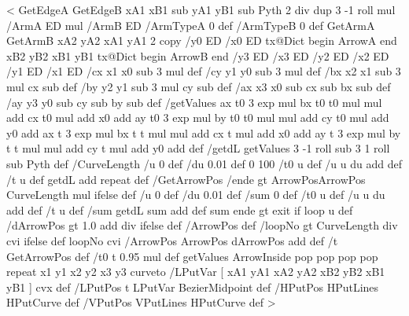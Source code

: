 %
<{%
	GetEdgeA GetEdgeB
	xA1 xB1 sub yA1 yB1 sub
	Pyth 2 div dup 3 -1 roll mul
	/ArmA ED
	mul
	/ArmB ED
	/ArmTypeA 0 def
	/ArmTypeB 0 def
	GetArmA GetArmB
	xA2 yA2 xA1 yA1
	2 copy
	/y0 ED /x0 ED
	tx@Dict begin
		ArrowA
	end
	xB2 yB2 xB1 yB1
	tx@Dict begin
		ArrowB
	end
	/y3 ED /x3 ED /y2 ED /x2 ED /y1 ED /x1 ED
	/cx x1 x0 sub 3 mul def
	/cy y1 y0 sub 3 mul def
	/bx x2 x1 sub 3 mul cx sub def
	/by y2 y1 sub 3 mul cy sub def
	/ax x3 x0 sub cx sub bx sub def
	/ay y3 y0 sub cy sub by sub def
	/getValues {
		ax t0 3 exp mul bx t0 t0 mul mul add cx t0 mul add x0 add
		ay t0 3 exp mul by t0 t0 mul mul add cy t0 mul add y0 add
		ax t 3 exp mul bx t t mul mul add cx t mul add x0 add
	ay t 3 exp mul by t t mul mul add cy t mul add y0 add
	} def
	/getdL {
		getValues
		3 -1 roll sub 3 1 roll sub Pyth
	} def
	/CurveLength {
		/u 0 def
		/du 0.01 def
		0 100 {
			/t0 u def
			/u u du add def
			/t u def
			getdL add
		} repeat } def
	/GetArrowPos {
		/ende \psk@ArrowInsidePos{} gt {ArrowPos}{ArrowPos CurveLength mul} ifelse def
		/u 0 def
		/du 0.01 def
		/sum 0 def
		{
			/t0 u def
			/u u du add def
			/t u def
			/sum getdL sum add def
			sum ende gt {exit} if
		} loop u
	} def
	/dArrowPos  gt {%
		1.0  add div
	}{ \psk@ArrowInsidePos } ifelse def
	/ArrowPos \psk@ArrowInsideOffset\space def
	/loopNo \psk@ArrowInsidePos{} gt {%
		CurveLength \psk@ArrowInsidePos\space div cvi
		}{ \psk@ArrowInsideNo } ifelse def
	loopNo cvi {
		/ArrowPos ArrowPos dArrowPos add def
		/t GetArrowPos def
		/t0 t 0.95 mul def
		getValues
		ArrowInside pop pop pop pop
	} repeat
	x1 y1 x2 y2 x3 y3 curveto
	/LPutVar [ xA1 yA1 xA2 yA2 xB2 yB2 xB1 yB1 ] cvx def
	/LPutPos { t LPutVar BezierMidpoint } def
	/HPutPos { { HPutLines } HPutCurve } def
	/VPutPos { { VPutLines } HPutCurve } def
}>
%
\def\parseRP#1;#2;#3\@nil{%
  \def\arg@A{#1}\def\arg@B{#2}}
%
\def\Put{\pst@object{Put}}%
\def\Put@i{\@ifnextchar({\Put@ii{}}{\Put@ii}}%
\def\Put@ii#1(#2)#3{{%
  \pst@killglue%
  \use@par%
  \expandafter\parseRP#1;;\@nil%
  \ifx\arg@B\@empty%
    \edef\arg@A{\if@star*\fi\ifx\arg@A\@empty\else[\arg@A]\fi}%
    \expandafter\rput\arg@A(>#2){#3}
  \else%
    \edef\arg@A{\if@star*\fi%
      \ifx\arg@A\@empty\else{\arg@A}\fi%
      \ifx\arg@B\@empty[0]\else[\arg@B]\fi}%
    \expandafter\uput\arg@A(>#2){#3}
  \fi}\ignorespaces}%

